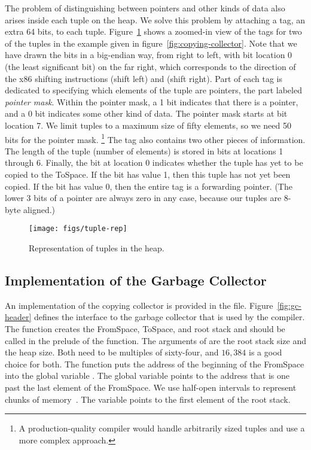 \documentclass[7x10]{TimesAPriori_MIT}%
\numberwithin{theorem}{chapter}
\numberwithin{definition}{chapter}
\numberwithin{equation}{chapter}
\begin{document}
The problem of distinguishing between pointers and other kinds of data
also arises inside each tuple on the heap. We solve this problem by
attaching a tag, an extra 64 bits, to each
tuple. Figure~\ref{fig:tuple-rep} shows a zoomed-in view of the tags for
two of the tuples in the example given in figure~\ref{fig:copying-collector}.
Note that we have drawn the bits in a big-endian way, from right to left,
with bit location 0 (the least significant bit) on the far right,
which corresponds to the direction of the x86 shifting instructions
 (shift left) and  (shift right). Part of each tag
is dedicated to specifying which elements of the tuple are pointers,
the part labeled \emph{pointer mask}. Within the pointer mask, a 1 bit
indicates that there is a pointer, and a 0 bit indicates some other kind of
data. The pointer mask starts at bit location 7. We limit tuples to a
maximum size of fifty elements, so we need 50 bits for the pointer
mask.%
%
\footnote{A production-quality compiler would handle
arbitrarily sized tuples and use a more complex approach.}
%
The tag also contains two other pieces of information. The length of
the tuple (number of elements) is stored in bits at locations 1 through
6. Finally, the bit at location 0 indicates whether the tuple has yet
to be copied to the ToSpace.  If the bit has value 1, then this tuple
has not yet been copied.  If the bit has value 0, then the entire tag
is a forwarding pointer. (The lower 3 bits of a pointer are always
zero in any case, because our tuples are 8-byte aligned.)

\begin{figure}[tbp]
  \centering
  \begin{tcolorbox}[colback=white]
    \texttt{[image: figs/tuple-rep]}
  \end{tcolorbox}
  \caption{Representation of tuples in the heap.}
\label{fig:tuple-rep}
\end{figure}

\subsection{Implementation of the Garbage Collector}
\label{sec:organize-gz}

An implementation of the copying collector is provided in the
 file. Figure~\ref{fig:gc-header} defines the
interface to the garbage collector that is used by the compiler. The
 function creates the FromSpace, ToSpace, and root
stack and should be called in the prelude of the 
function. The arguments of  are the root stack size
and the heap size. Both need to be multiples of sixty-four, and $16,384$ is a
good choice for both.  The  function puts the address
of the beginning of the FromSpace into the global variable
. The global variable  points to
the address that is one past the last element of the FromSpace. We use
half-open intervals to represent chunks of
memory~\citep{Dijkstra:1982aa}.  The  variable
points to the first element of the root stack.
\end{document}
